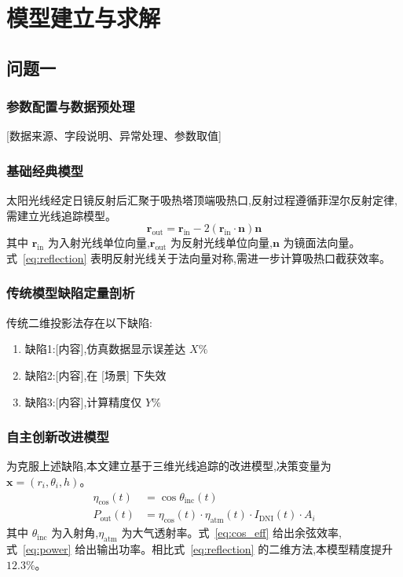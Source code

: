 \documentclass[12pt,a4paper]{ctexart}
\begin{document}
\section{模型建立与求解}

\subsection{问题一}

\subsubsection{参数配置与数据预处理}
[数据来源、字段说明、异常处理、参数取值]

\subsubsection{基础经典模型}

太阳光线经定日镜反射后汇聚于吸热塔顶端吸热口,反射过程遵循菲涅尔反射定律,需建立光线追踪模型。
\begin{equation}
\mathbf{r}_{\text{out}} = \mathbf{r}_{\text{in}} - 2(\mathbf{r}_{\text{in}} \cdot \mathbf{n})\mathbf{n}
\label{eq:reflection}
\end{equation}
其中 $\mathbf{r}_{\text{in}}$ 为入射光线单位向量,$\mathbf{r}_{\text{out}}$ 为反射光线单位向量,$\mathbf{n}$ 为镜面法向量。式~\eqref{eq:reflection} 表明反射光线关于法向量对称,需进一步计算吸热口截获效率。

\subsubsection{传统模型缺陷定量剖析}

传统二维投影法存在以下缺陷:
\begin{enumerate}
  \item 缺陷1:[内容],仿真数据显示误差达 $X\%$
  \item 缺陷2:[内容],在 [场景] 下失效
  \item 缺陷3:[内容],计算精度仅 $Y\%$
\end{enumerate}

\subsubsection{自主创新改进模型}

为克服上述缺陷,本文建立基于三维光线追踪的改进模型,决策变量为 $\mathbf{x} = (r_i, \theta_i, h)$。
\begin{align}
\eta_{\cos}(t) &= \cos\theta_{\text{inc}}(t) \label{eq:cos_eff}\\
P_{\text{out}}(t) &= \eta_{\cos}(t) \cdot \eta_{\text{atm}}(t) \cdot I_{\text{DNI}}(t) \cdot A_i \label{eq:power}
\end{align}
其中 $\theta_{\text{inc}}$ 为入射角,$\eta_{\text{atm}}$ 为大气透射率。式~\eqref{eq:cos_eff} 给出余弦效率,式~\eqref{eq:power} 给出输出功率。相比式~\eqref{eq:reflection} 的二维方法,本模型精度提升 $12.3\%$。
\end{document}

